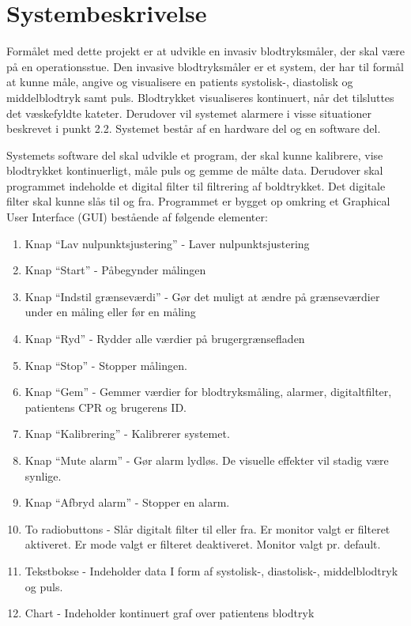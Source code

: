 \section{Systembeskrivelse}
Formålet med dette projekt er at udvikle en invasiv blodtryksmåler, der skal være på en operationsstue. Den invasive blodtryksmåler er et system, der har til formål at kunne måle, angive og visualisere en patients systolisk-, diastolisk og middelblodtryk samt puls. Blodtrykket visualiseres kontinuert, når det tilsluttes det væskefyldte kateter. Derudover vil systemet alarmere i visse situationer beskrevet i punkt 2.2.
Systemet består af en hardware del og en software del. 


Systemets software del skal udvikle et program, der skal kunne kalibrere, vise blodtrykket kontinuerligt, måle puls og gemme de målte data. Derudover skal programmet indeholde et digital filter til filtrering af boldtrykket. Det digitale filter skal kunne slås til og fra. Programmet er bygget op omkring et Graphical User Interface (GUI) bestående af følgende elementer:
\vspace{0.7 cm}

\begin{enumerate}[2.1.]
	\item Knap “Lav nulpunktsjustering” - Laver nulpunktsjustering
	\item Knap “Start” - Påbegynder målingen
	\item Knap “Indstil grænseværdi” - Gør det muligt at ændre på grænseværdier under en måling eller før en måling 
	\item Knap “Ryd” - Rydder alle værdier på brugergrænsefladen
	\item Knap “Stop” - Stopper målingen.
	\item Knap “Gem” - Gemmer værdier for blodtryksmåling, alarmer, digitaltfilter, patientens CPR og brugerens ID.
	\item Knap “Kalibrering” - Kalibrerer systemet.
	\item Knap “Mute alarm” - Gør alarm lydløs. De visuelle effekter vil stadig være synlige.
	\item Knap “Afbryd alarm” - Stopper en alarm.
	\item To radiobuttons - Slår digitalt filter til eller fra. Er monitor valgt er filteret aktiveret. Er mode valgt er filteret deaktiveret. Monitor valgt pr. default. 
	\item Tekstbokse - Indeholder data I form af systolisk-, diastolisk-, middelblodtryk og puls. 
	\item Chart - Indeholder kontinuert graf over patientens blodtryk
\end{enumerate}


